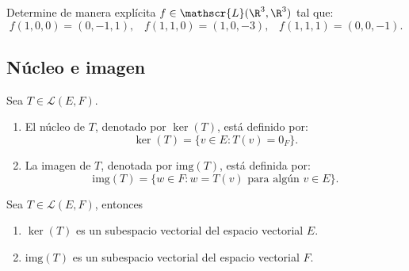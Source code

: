 \documentclass[compacto,10pt]{pubciencias-notas}
\begin{document}
\begin{ejer}
Determine de manera explícita $f \in \mathscr{L}(\R^{3}, \R^3)$ tal que:
\[
    f(1, 0, 0) = (0,-1,1), \;\;\; f(1, 1, 0) = (1,0,-3), \;\;\; f(1, 1, 1) = (0,0,-1).
\]
\end{ejer}

\setcounter{subsection}{2}
\subsection{Núcleo e imagen}

\begin{defi}
    Sea $T \in \mathscr{L}(E,F)$.
    \begin{enumerate}
    \item 
        El núcleo de $T$, denotado por $\ker(T)$, está definido por:
        \[
            \ker(T) = \{v \in E: T(v) = 0_{F}\}.
        \]
    \item 
        La imagen de $T$, denotada por $\text{img}(T)$, está definida por:
        \[
            \text{img}(T) = \{ w \in F: w = T(v) \text{ para algún } v \in E\}.
        \]
    \end{enumerate}
\end{defi}

\begin{prop}
    Sea $T \in \mathscr{L}(E,F)$, entonces
    \begin{enumerate}
    \item 
        $\ker(T)$ es un subespacio vectorial del espacio vectorial $E$.
    \item 
        $\text{img}(T)$ es un subespacio vectorial del espacio vectorial $F$.
    \end{enumerate}
\end{prop}
\end{document}
